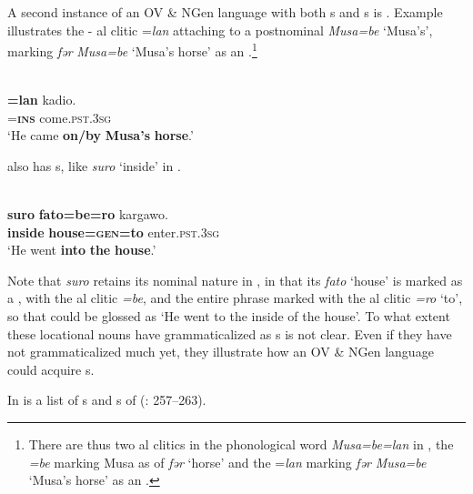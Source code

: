 \documentclass[output=paper]{langsci/langscibook}
\begin{document}
A second instance of an OV \& NGen language with both s and s is . Example  illustrates the - al clitic =\textit{lan} attaching to a postnominal  \textit{Musa=be} ‘Musa’s’, marking \textit{fər} \textit{Musa=be} ‘Musa’s horse’ as an .\footnote{There are thus two al clitics in the phonological word \textit{Musa=be=lan} in , the \textit{=be} marking Musa as  of \textit{fər} ‘horse’ and the =\textit{lan} marking  \textit{fər} \textit{Musa=be} ‘Musa’s horse’ as an .}

\ea\label{ex:dryer:33}
\\
\gll [\textbf{fər}  \textbf{Musa=be}]\textbf{=lan}  kadio.\\
       [\textbf{horse}  \textbf{Musa=\textsc{gen}}]=\textbf{\textsc{ins}}  come.\textsc{pst}.3\textsc{sg}  \\
\glt ‘He came \textbf{on/by} \textbf{Musa’s} \textbf{horse}.’
\z



\noindent {} also has s, like \textit{suro} ‘inside’ in .

\ea\label{ex:dryer:34}
\\
\gll   \textbf{suro}  \textbf{fato=be=ro}  kargawo.\\
       \textbf{inside}  \textbf{house=\textsc{gen}}\textbf{=to}  enter.\textsc{pst}.3\textsc{sg} \\
\glt   ‘He went \textbf{into} \textbf{the} \textbf{house}.’
\z

\noindent Note that \textit{suro} retains its nominal nature in , in that its  \textit{fato} ‘house’ is marked as a , with the  al clitic \textit{=be}, and the entire phrase marked with the al clitic \textit{=ro} ‘to’, so that  could be glossed as ‘He went to the inside of the house’. To what extent these locational nouns have grammaticalized as s is not clear. Even if they have not grammaticalized much yet, they illustrate how an OV \& NGen language could acquire s.

In  is a list of s and s of  (\citealt{Hutchinson1981}: 257–263).
\end{document}

